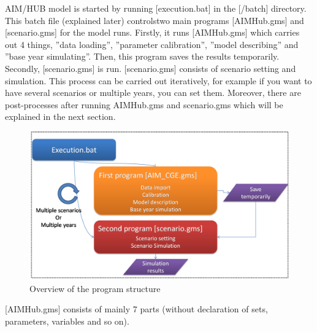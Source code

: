 \documentclass[10pt,a4paper,titlepage,dvipdfmx]{book}
\begin{document}
AIM/HUB model is started by running [execution.bat] in the [/batch] directory. This batch file (explained later) controlstwo main programs [AIMHub.gms] and [scenario.gms] for the model runs. Firstly, it runs [AIMHub.gms] which carries out 4 things, ''data loading'', ''parameter calibration'', ''model describing'' and ''base year simulating''. Then, this program saves the results temporarily. Secondly, [scenario.gms] is run. [scenario.gms] consists of scenario setting and simulation. This process can be carried out iteratively, for example if you want to have several scenarios or multiple years, you can set them. Moreover, there are post-processes after running AIMHub.gms and scenario.gms which will be explained in the next section.
\begin{figure}
\includegraphics[width=1\textwidth]{fig/image10.png}
\caption{Overview of the program structure}
\label{fig:OverProg}
\end{figure}
   [AIMHub.gms] consists of mainly 7 parts (without declaration of sets, parameters, variables and so on). 
\end{document}
